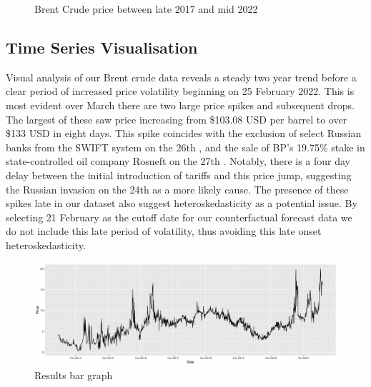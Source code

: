 \begin{figure}[H]
    \centering
    \caption{Brent Crude price between late 2017 and mid 2022}%
    \label{fig:Brent-Crude-price}%
\end{figure}

\subsection{Time Series Visualisation}

Visual analysis of our Brent crude data reveals a steady two year trend before a clear period of increased price volatility beginning on 25 February 2022. This is most evident over March there are two large price spikes and subsequent drops. The largest of these saw price increasing from \$103.08 USD per barrel to over \$133 USD in eight days. This spike coincides with the exclusion of select Russian banks from the SWIFT system on the 26th \cite{mitch5}, and the sale of BP’s 19.75\% stake in state-controlled oil company Rosneft on the 27th \cite{mitch6}. Notably, there is a four day delay between the initial introduction of tariffs and this price jump, suggesting the Russian invasion on the 24th as a more likely cause. The presence of these spikes late in our dataset also suggest heteroskedasticity as a potential issue. By selecting 21 February as the cutoff date for our counterfactual forecast data we do not include this late period of volatility, thus avoiding this late onset heteroskedasticity.

\begin{figure}[H]
    \centering
    \includegraphics[width=.8\textwidth]{Figures/Data-desc/GSH trade price.png}
    \caption{Results bar graph}
    \label{fig:GSH-trade-price}
\end{figure}

